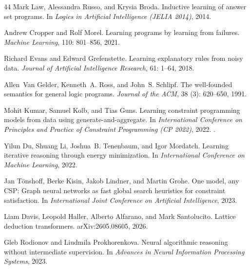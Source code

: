\documentclass[10pt]{article}
\begin{document}
\begin{thebibliography}{44}
Mark Law, Alessandra Russo, and Krysia Broda.
\newblock Inductive learning of answer set programs.
\newblock In \emph{Logics in Artificial Intelligence (JELIA 2014)}, 2014.

Andrew Cropper and Rolf Morel.
\newblock Learning programs by learning from failures.
\newblock \emph{Machine Learning}, 110: 801--856, 2021.

Richard Evans and Edward Grefenstette.
\newblock Learning explanatory rules from noisy data.
\newblock \emph{Journal of Artificial Intelligence Research}, 61:
  1--64, 2018.

Allen~Van Gelder, Kenneth~A. Ross, and John~S. Schlipf.
\newblock The well-founded semantics for general logic programs.
\newblock \emph{Journal of the ACM}, 38 (3): 620--650, 1991.

Mohit Kumar, Samuel Kolb, and Tias Guns.
\newblock Learning constraint programming models from data using
  generate-and-aggregate.
\newblock In \emph{International Conference on Principles and Practice of
  Constraint Programming (CP 2022)}, 2022.
\newblock {}.

Yilun Du, Shuang Li, Joshua~B. Tenenbaum, and Igor Mordatch.
\newblock Learning iterative reasoning through energy minimization.
\newblock In \emph{International Conference on Machine Learning}, 2022.

Jan T{\"o}nshoff, Berke Kisin, Jakob Lindner, and Martin Grohe.
\newblock One model, any {CSP}: Graph neural networks as fast global search
  heuristics for constraint satisfaction.
\newblock In \emph{International Joint Conference on Artificial Intelligence},
  2023.

Liam Davis, Leopold Haller, Alberto Alfarano, and Mark Santolucito.
\newblock Lattice deduction transformers.
\newblock arXiv:2605.08605, 2026.

Gleb Rodionov and Liudmila Prokhorenkova.
\newblock Neural algorithmic reasoning without intermediate supervision.
\newblock In \emph{Advances in Neural Information Processing Systems}, 2023.


\end{thebibliography}
\end{document}
